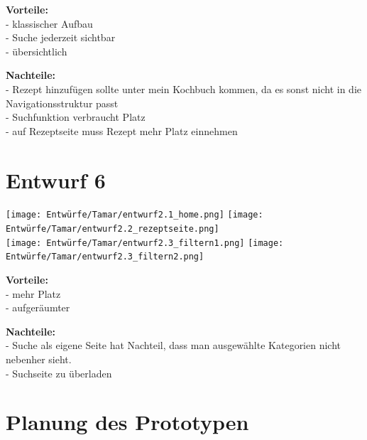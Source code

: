 \documentclass[parskip,10pt,abstracton]{scrartcl}
\begin{document}
\textbf{Vorteile:}\\
- klassischer Aufbau\\
- Suche jederzeit sichtbar\\
- übersichtlich

\textbf{Nachteile:}\\
- Rezept hinzufügen sollte unter mein Kochbuch kommen, da es sonst nicht in die Navigationsstruktur passt\\
- Suchfunktion verbraucht Platz\\
- auf Rezeptseite muss Rezept mehr Platz einnehmen
\newpage
\section*{Entwurf 6} %

\texttt{[image: Entwürfe/Tamar/entwurf2.1\_home.png]}
\texttt{[image: Entwürfe/Tamar/entwurf2.2\_rezeptseite.png]}\\
\texttt{[image: Entwürfe/Tamar/entwurf2.3\_filtern1.png]}
\texttt{[image: Entwürfe/Tamar/entwurf2.3\_filtern2.png]}


\textbf{Vorteile:} \\
- mehr Platz\\
- aufgeräumter

\textbf{Nachteile:}\\
- Suche als eigene Seite hat Nachteil, dass man ausgewählte Kategorien nicht nebenher sieht.\\
- Suchseite zu überladen


\pagebreak
\section*{Planung des Prototypen}
\end{document}
